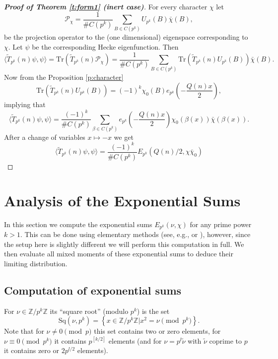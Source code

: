 \documentclass[12pt]{amsart}
\theoremstyle{definition}
\theoremstyle{remark}
\numberwithin{equation}{section}
\newcommand{\set}[1]{\left\{#1\right\}}
\newcommand{\T}[1]{\tilde{T}_{#1}}
\newcommand{\calP}{\mathcal{P}}
\newcommand{\bbZ}{\mathbb{Z}}
\newcommand{\Tr}{ \mbox{Tr}}
\newcommand{\Sq}{\mathrm{Sq}}
\begin{document}
\begin{proof}[ \bf{Proof of Theorem \ref{t:form1}} (inert case)]
For every character $\chi$ let
\[\calP_\chi=\frac{1}{\# C(p^k)}\sum_{B\in C(p^k)} U_{p^k}(B)\bar\chi(B),\]
be the projection operator to the (one dimensional) eigenspace
corresponding to $\chi$. Let $\psi$ be the corresponding Hecke
eigenfunction. Then
\[\langle \T{p^k}(n)\psi,\psi\rangle=\Tr(\T{p^k}(n)\calP_\chi)=\frac{1}{\# C(p^k)}\sum_{B\in C(p^k)} \Tr(\T{p^k}(n)U_{p^k}(B))\bar\chi(B).\]
Now from the Proposition \ref{p:character}
\[\Tr(\T{p^k}(n)U_{p^k}(B))=(-1)^k\chi_0(B)e_{p^k}(-\frac{Q(n)x}{2}),\]
implying that
\[\langle \T{p^k}(n)\psi,\psi\rangle=\frac{(-1)^k}{\# C(p^k)}\sum_{\beta\in C(p^k)} e_{p^k}(-\frac{Q(n)x}{2})\chi_0(\beta(x))\bar\chi(\beta(x)).\]
After a change of variables $x\mapsto -x$ we get
\[\langle \T{p^k}(n)\psi,\psi\rangle=\frac{(-1)^k}{\# C(p^k)}E_{p^k}(Q(n)/2,\chi\bar\chi_0)\]
\end{proof}


\section{Analysis of the Exponential Sums}\label{s:comp}
In this section we compute the exponential sums $E_{p^k}(\nu,\chi)$
for any prime power $k>1$. This can be done using elementary methods
(see, e.g., \cite[section 12.3]{IwaniecKowalski} or \cite[Chapter
1.6]{BerndtEvansWilliams}), however, since the setup here is
slightly different we will perform this computation in full. We then
evaluate all mixed moments of these exponential sums to deduce their
limiting distribution.


\subsection{Computation of exponential sums}
For $\nu\in\bbZ/p^k\bbZ$ its ``square root'' (modulo $p^k$) is the
set
$$\Sq(\nu,p^k)=\set{x\in\bbZ/p^k\bbZ|x^2=\nu\pmod{p^k}}.$$
Note that for $\nu\neq 0\pmod {p}$ this set contains two or zero
elements, for $\nu\equiv 0\pmod {p^k}$ it contains $p^{[k/2]}$
elements (and for $\nu=p^l\tilde\nu$ with $\tilde\nu$ coprime to $p$
it contains zero or $2p^{l/2}$ elements).
\end{document}
